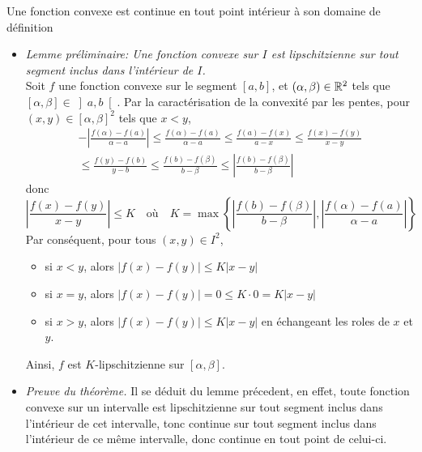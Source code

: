 \documentclass{article}
\renewenvironment{question_kholle}[2][ ]
{
	\subsection{\texorpdfstring{#2}{}}
	\notblank{#1}
	{
		\noindent #1
		\bigbreak
	}
	{}
	\begin{proof}
}
{
	\end{proof}
}
\begin{document}
\begin{question_kholle}{Une fonction convexe est continue en tout point intérieur à son domaine de définition}
	\hfill\\
	\begin{itemize}[label=$\vartriangleright$]
		\item \textit{Lemme préliminaire: Une fonction convexe sur $I$ est lipschitzienne sur tout segment inclus dans l’intérieur de $I$.}\\
		      Soit $f$ une fonction convexe sur le segment $[a,b]$, et $(\alpha, \beta)\in\mathbb R^{2}$ tels que $[\alpha, \beta]\in\left]a,b\right[$.
		      Par la caractérisation de la convexité par les pentes, pour $(x,y)\in[\alpha, \beta]^{2}$ tels que $x<y$,
		      \begin{multline*}
			      -\left|\frac{f(\alpha)-f(a)}{\alpha-a}\right| \leq \frac{f(\alpha)-f(a)}{\alpha-a} \leq \frac{f(a)-f(x)}{a-x} \leq \frac{f(x)-f(y)}{x-y}\\ \leq \frac{f(y)-f(b)}{y-b} \leq \frac{f(b)-f(\beta)}{b-\beta} \leq \left|\frac{f(b)-f(\beta)}{b-\beta}\right|
		      \end{multline*}
		      donc
		      \[
			      \left|\frac{f(x)-f(y)}{x-y}\right| \leq K \quad\text{où}\quad K=\max \left\{\left|\frac{f(b)-f(\beta)}{b-\beta}\right|, \left|\frac{f(\alpha)-f(a)}{\alpha-a}\right|\right\}
		      \]
		      Par conséquent, pour tous $(x,y)\in I^{2}$,
		      \begin{itemize}
			      \item si $x<y$, alors $|f(x)-f(y)|\leq K |x-y|$
			      \item si $x=y$, alors $|f(x)-f(y)|=0 \leq K\cdot 0 = K |x-y|$
			      \item si $x>y$, alors $|f(x)-f(y)| \leq K|x-y|$ en échangeant les roles de $x$ et $y$.
		      \end{itemize}
		      Ainsi, $f$ est $K$-lipschitzienne sur $[\alpha, \beta]$.

		\item \textit{Preuve du théorème.} Il se déduit du lemme précedent, en effet, toute fonction convexe sur un intervalle est lipschitzienne sur tout segment inclus dans l’intérieur de cet intervalle, tonc continue sur tout segment inclus dans l’intérieur de ce même intervalle, donc continue en tout point de celui-ci.
	\end{itemize}
\end{question_kholle}
\end{document}
